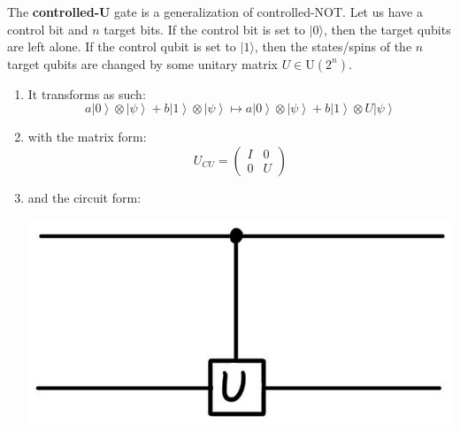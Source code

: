 \documentclass{article}
\newcommand{\ket}[1]{\ensuremath{\left|#1\right\rangle}}
\begin{document}
    \begin{definition}[Control U]
      The \textbf{controlled-U} gate is a generalization of controlled-NOT. Let us have a control bit and $n$ target bits. If the control bit is set to $|0 \rangle$, then the target qubits are left alone. If the control qubit is set to $|1\rangle$, then the states/spins of the $n$ target qubits are changed by some unitary matrix $U \in \text{U}(2^n)$.
      \begin{enumerate} 
        \item It transforms as such: 
          \begin{equation} 
            a \ket{0} \otimes \ket{\psi} + b \ket{1} \otimes \ket{\psi} \mapsto a \ket{0} \otimes \ket{\psi} + b \ket{1} \otimes U \ket{\psi}
          \end{equation}
        \item with the matrix form: 
          \begin{equation} 
            U_{CU} = \begin{pmatrix} I & 0 \\ 0 & U \end{pmatrix}
          \end{equation}
        \item and the circuit form: 
          \begin{center}
            \includegraphics[scale=0.3]{img/Control_U_gate.jpg}
          \end{center}
      \end{enumerate}
    \end{definition}
\end{document}
